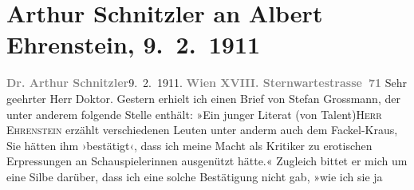 

         
         \renewcommand{\erwaehntePersonen}{Personen: Albert Ehrenstein, Stefan Großmann, Karl Kraus}
         \renewcommand{\erwaehnteInstitutionen}{Institutionen: Die Fackel}
         \renewcommand{\erwaehnteOrte}{Orte: Sternwartestraße, Wien}
         \renewcommand{\erwaehnteWerke}{}
               \section[Arthur Schnitzler an Albert Ehrenstein, 9. 2. 1911]{ Arthur Schnitzler an Albert Ehrenstein, 9. 2. 1911}\nopagebreak{}\rehead{ }\begin{ledgroupsized}[t]{13cm}\normalsize\beginnumbering \toendnotes[C]{\smallbreak\pagebreak[2]} 
\pstart
           {\pb}\textcolor{gray}{\textbf{Dr. Arthur Schnitzler}}\hfill 9. 2. 1911.\pend
           \pstart
           \textcolor{gray}{\textbf{Wien XVIII. Sternwartestrasse 71}}\pend
           \pstart{}Sehr geehrter Herr Doktor.\pend\pstart
           Gestern erhielt ich einen Brief von Stefan
                  Grossmann, der unter anderem folgende Stelle enthält: »Ein junger Literat
                  \introOben{}(\introOben{}von Talent\introOben{})\introOben{}{ }\introOben{}\textsc{Herr Ehrenstein}\introOben{} erzählt verschiedenen Leuten unter anderm auch dem Fackel-Kraus, Sie hätten
               ihm ›bestätigt‹, dass ich meine Macht als Kritiker zu erotischen Erpressungen an
               Schauspielerinnen ausgenützt hätte.« Zugleich bittet er mich um eine Silbe darüber,
               dass ich eine solche Bestätigung nicht gab, \introOben{}»\introOben{}wie ich sie ja

\end{ledgroupsized}
